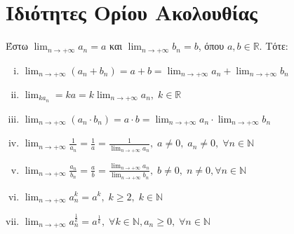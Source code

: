 \documentclass[main.tex]{subfiles}
\begin{document}
\section{Ιδιότητες Ορίου Ακολουθίας}



\begin{prop}

    Έστω $ \lim_{n \to +\infty} a_{n} = a$ και $ \lim_{n \to +\infty} b_{n} = b $, όπου $ a,b \in
    \mathbb{R} $. Τότε:
    \begin{enumerate}[i)]
        \item $ \lim_{n \to +\infty} (a_{n} + b_{n}) = a+b = \lim_{n \to +\infty} a_{n} + 
            \lim_{n \to +\infty} b_{n} $
        \item $ \lim_{k a_{n}} = ka = k \lim_{n \to +\infty} a_{n}, \; k \in \mathbb{R} $
        \item $ \lim_{n \to +\infty} (a_{n}\cdot b_{n}) = a\cdot b = \lim_{n \to +\infty} a_{n}
            \cdot \lim_{n \to +\infty} b_{n}$
        \item $ \lim_{n \to +\infty} \frac{1}{a_{n}} = \frac{1}{a} = \frac{1}{\lim_{n \to +\infty}
            a_{n}}, \; a \neq 0, \; a_{n} \neq 0, \; \forall n \in \mathbb{N}  $
        \item $ \lim_{n \to +\infty} \frac{a_{n}}{b_{n}} = \frac{a}{b} = \frac{\lim_{n \to +\infty}
            a_{n}}{\lim_{n \to +\infty} b_{n}}, \; b \neq 0, \; n \neq 0, \forall n \in
            \mathbb{N} $
        \item $ \lim_{n \to +\infty} a_{n}^{k} = a^{k}, 
            \; k \geq 2, \; k \in \mathbb{N}  $  
        \item $ \lim_{n \to +\infty} a_{n}^{\frac{1}{k}}=a^{\frac{1}{k}}, \; \forall k \in 
            \mathbb{N}, a_{n} \geq 0, \; \forall n \in \mathbb{N} $
    \end{enumerate}
\end{prop}
\end{document}
